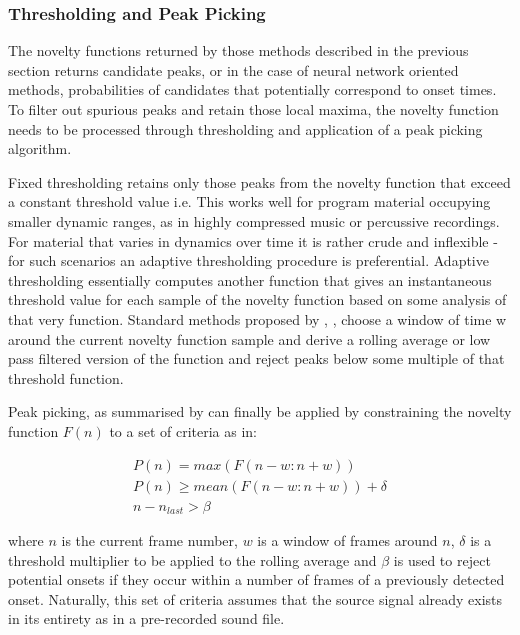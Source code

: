 \subsubsection{Thresholding and Peak Picking}
\label{sec:peak_picking}

The novelty functions returned by those methods described in the previous section returns candidate peaks, or in the case of neural network oriented methods, probabilities of candidates that potentially correspond to onset times. To filter out spurious peaks and retain those local maxima, the novelty function needs to be processed through thresholding and application of a peak picking algorithm. 

Fixed thresholding retains only those peaks from the novelty function that exceed a constant threshold value i.e. This works well for program material occupying smaller dynamic ranges, as in highly compressed music or percussive recordings. For material that varies in dynamics over time it is rather crude and inflexible - for such scenarios an adaptive thresholding procedure is preferential. Adaptive thresholding essentially computes another function that gives an instantaneous threshold value for each sample of the novelty function based on some analysis of that very function. Standard methods proposed by
\cite{Bello2005b}, \cite{Dixon2006}, \cite{Bock2012a, Bock2013} choose a window of time w around the current novelty function sample and derive a rolling average or low pass filtered version of the function and reject peaks below some multiple of that threshold function.

Peak picking, as summarised by \cite{Bock2012a} can finally be applied by constraining the novelty function $F(n)$ to a set of criteria as in:

\begin{equation}
  \label{eq:peak_picking}
  \begin{gathered}
P(n)=max(F(n-w:n+w))\\
P(n)\geq mean(F(n-w:n+w))+\delta\\
n-n_{last}>\beta
  \end{gathered}
\end{equation}

where $n$ is the current frame number, $w$ is a window of frames around $n$, $\delta$ is a threshold multiplier to be applied to the rolling average and $\beta$ is used to reject potential onsets if they occur within a number of frames of a previously detected onset. Naturally, this set of criteria assumes that the source signal already exists in its entirety as in a pre-recorded sound file.

